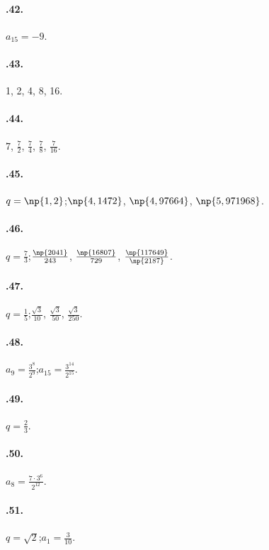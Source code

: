 \begin{multicols}{2}
\paragraph{\thechapter.42.} $a_{15}=-9$.

\paragraph{\thechapter.43.} 1, 2, 4, 8, 16.

\paragraph{\thechapter.44.} 7, $\frac{7}{2}$, $\frac{7}{4}$, $\frac{7}{8}$, $\frac{7}{16}$.

\paragraph{\thechapter.45.} $q=\np{1,2}$;\quad $\np{4,1472}$, $\np{4,97664}$, $\np{5,971968}$.

\paragraph{\thechapter.46.} $q=\frac{7}{3}$;\quad $\frac{\np{2041}}{243}$, $\frac{\np{16807}}{729}$, $\frac{\np{117649}}{\np{2187}}$.

\paragraph{\thechapter.47.} $q=\frac{1}{5}$;\quad $\frac{\sqrt{3}}{10}$, $\frac{\sqrt{3}}{50}$, $\frac{\sqrt{3}}{250}$.

\paragraph{\thechapter.48.} $a_9=\frac{3^8}{2^9}$;\quad $a_{15}=\frac{3^{14}}{2^{15}}$.

\paragraph{\thechapter.49.} $q=\frac{2}{3}$.

\paragraph{\thechapter.50.} $a_8=\frac{7\cdot3^6}{2^{12}}$.

\paragraph{\thechapter.51.} $q=\sqrt{2}$;\quad $a_1=\frac{3}{10}$.


\end{multicols}
